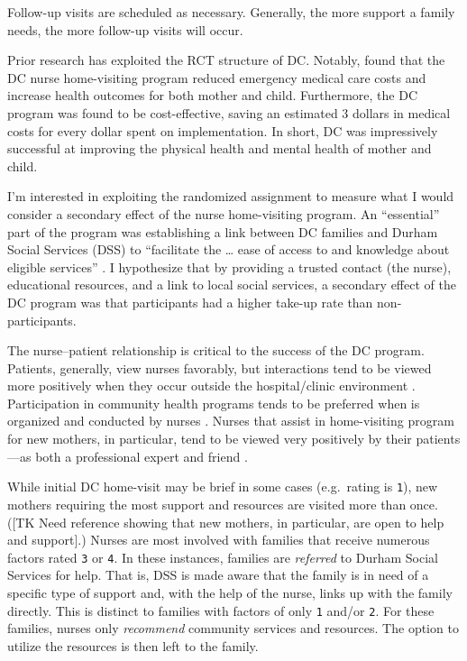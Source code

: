 \documentclass[12pt,letterpaperpaper,]{book}
\begin{document}
Follow-up visits are scheduled as necessary. Generally, the more support
a family needs, the more follow-up visits will occur.

Prior research has exploited the RCT structure of DC. Notably,
\citet{dodge_implementation_2013} found that the DC nurse home-visiting
program reduced emergency medical care costs and increase health
outcomes for both mother and child. Furthermore, the DC program was
found to be cost-effective, saving an estimated 3 dollars in medical
costs for every dollar spent on implementation. In short, DC was
impressively successful at improving the physical health and mental
health of mother and child.

I'm interested in exploiting the randomized assignment to measure what I
would consider a secondary effect of the nurse home-visiting program. An
``essential'' part of the program was establishing a link between DC
families and Durham Social Services (DSS) to ``facilitate the \ldots{}
ease of access to and knowledge about eligible services''
\citep{odonnell_family_2015}. I hypothesize that by providing a trusted
contact (the nurse), educational resources, and a link to local social
services, a secondary effect of the DC program was that participants had
a higher take-up rate than non-participants.

The nurse--patient relationship is critical to the success of the DC
program. Patients, generally, view nurses favorably, but interactions
tend to be viewed more positively when they occur outside the
hospital/clinic environment \citep{jansson_first-time_2002}.
Participation in community health programs tends to be preferred when is
organized and conducted by nurses \citep{kneipp_reasons_2009}. Nurses
that assist in home-visiting program for new mothers, in particular,
tend to be viewed very positively by their patients---as both a
professional expert and friend \citep{landy_mothers_2012}.

While initial DC home-visit may be brief in some cases (e.g.~rating is
\texttt{1}), new mothers requiring the most support and resources are
visited more than once. ({[}TK Need reference showing that new mothers,
in particular, are open to help and support{]}.) Nurses are most
involved with families that receive numerous factors rated \texttt{3} or
\texttt{4}. In these instances, families are \emph{referred} to Durham
Social Services for help. That is, DSS is made aware that the family is
in need of a specific type of support and, with the help of the nurse,
links up with the family directly. This is distinct to families with
factors of only \texttt{1} and/or \texttt{2}. For these families, nurses
only \emph{recommend} community services and resources. The option to
utilize the resources is then left to the family.
\end{document}
